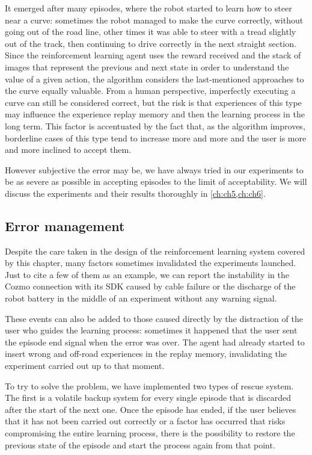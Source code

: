 It emerged after many episodes, where the robot started to learn how to steer near a curve: sometimes the robot managed to make the curve correctly, without going out of the road line, other times it was able to steer with a tread slightly out of the track, then continuing to drive correctly in the next straight section.
Since the reinforcement learning agent uses the reward received and the stack of images that represent the previous and next state in order to understand the value of a given action, the algorithm considers the last-mentioned approaches to the curve equally valuable.
From a human perspective, imperfectly executing a curve can still be considered correct, but the risk is that experiences of this type may influence the experience replay memory and then the learning process in the long term.
This factor is accentuated by the fact that, as the algorithm improves, borderline cases of this type tend to increase more and more and the user is more and more inclined to accept them.

However subjective the error may be, we have always tried in our experiments to be as severe as possible in accepting episodes to the limit of acceptability.
We will discuss the experiments and their results thoroughly in \vref{ch:ch5,ch:ch6}.

\subsection{Error management} \label{subsec:error-management}

Despite the care taken in the design of the reinforcement learning system covered by this chapter, many factors sometimes invalidated the experiments launched.
Just to cite a few of them as an example, we can report the instability in the Cozmo connection with its SDK caused by cable failure or the discharge of the robot battery in the middle of an experiment without any warning signal.

These events can also be added to those caused directly by the distraction of the user who guides the learning process: sometimes it happened that the user sent the episode end signal when the error was over.
The agent had already started to insert wrong and off-road experiences in the replay memory, invalidating the experiment carried out up to that moment.

To try to solve the problem, we have implemented two types of rescue system.
The first is a volatile backup system for every single episode that is discarded after the start of the next one.
Once the episode has ended, if the user believes that it has not been carried out correctly or a factor has occurred that risks compromising the entire learning process, there is the possibility to restore the previous state of the episode and start the process again from that point.

